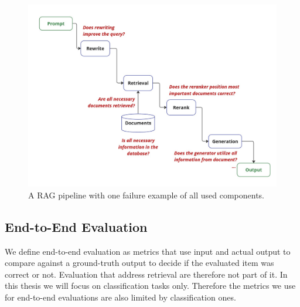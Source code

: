 \begin{figure}
  \centering
  \includegraphics[width=\textwidth]{images/FailurePointExamples.pdf}
  \caption{A RAG pipeline with one failure example of all used components.}
  \label{fig:failures}
\end{figure}

\subsection{End-to-End Evaluation}

We define end-to-end evaluation as metrics that use input and actual output to compare against a ground-truth output to decide if the evaluated item was correct or not. Evaluation that address retrieval are therefore not part of it. In this thesis we will focus on classification tasks only. Therefore the metrics we use for end-to-end evaluations are also limited by classification ones. 


